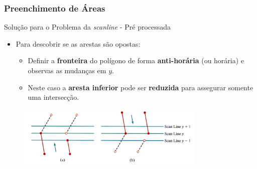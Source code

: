 \documentclass{beamer}
\begin{document}
\begin{frame}
\frametitle{Preenchimento de Áreas}

	\begin{block}{Solução para o Problema da \textit{scanline} - Pré processada}
		\begin{itemize}
			\item Para descobrir se as arestas são opostas:
			\begin{itemize}
				\item Definir a \textbf{fronteira} do polígono de forma \textbf{anti-horária} (ou horária) e observas as mudanças em $y$.
				\item Neste caso a \textbf{aresta inferior} pode ser \textbf{reduzida} para assegurar somente uma intersecção.
			\end{itemize}
		\end{itemize}
	\end{block}
	
	\begin{figure}[!h]
			\begin{center}
				\includegraphics[width=0.8\textwidth]{Figures/ScaPro}
			\end{center}
		\end{figure}
	
\end{frame}

\end{document}
